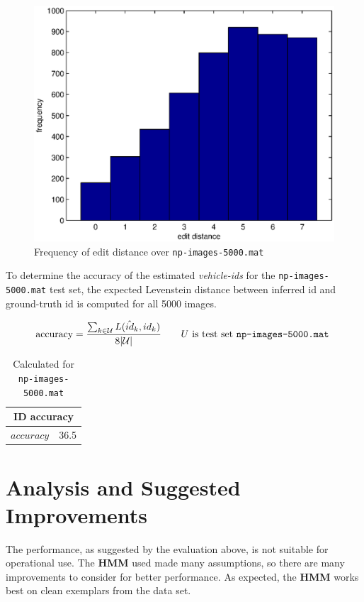 \documentclass[a4paper,12pt]{article}
\begin{document}
\begin{figure}[ht]
\begin{center}
\includegraphics[width=0.75\linewidth]{matlab/hamming.eps}
\caption{ Frequency of edit distance over \texttt{np-images-5000.mat}  } 
\label{fig:editdistance}
\end{center}
\end{figure}

To determine the accuracy of the estimated \emph{vehicle-ids} for the
\texttt{np-images-5000.mat} test set, the expected Levenstein distance
between inferred id and ground-truth id is computed for all 5000
images.

\[ \text{accuracy} = \frac{\sum_{k \in \mathcal{U}}
  L(\hat{id}_k,id_k)}{8|\mathcal{U}|} \qquad U \text{ is test set
  \texttt{np-images-5000.mat} }  \]

\begin{table}[ht]
\begin{center}
\begin{tabular}{|l|l|}
  \hline
  \multicolumn{2}{|c|}{ID accuracy} \\
  \hline
  $accuracy$ & 36.5%

\end{tabular}
\caption{Calculated for \texttt{np-images-5000.mat}}
\end{center}
\end{table}

\section{Analysis and Suggested Improvements}
The performance, as suggested by the evaluation above, is not suitable
for operational use. The \textbf{HMM} used made many assumptions, so
there are many improvements to consider for better performance. As
expected, the \textbf{HMM} works best on clean exemplars from the data
set.
\end{document}

